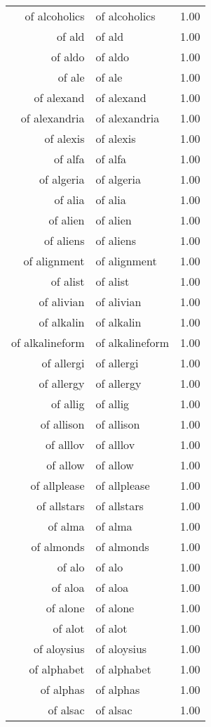 \begin{table}[ht]
\begin{tabular}{rlr}
  of alcoholics & of alcoholics & 1.00 \\ 
  of ald & of ald & 1.00 \\ 
  of aldo & of aldo & 1.00 \\ 
  of ale & of ale & 1.00 \\ 
  of alexand & of alexand & 1.00 \\ 
  of alexandria & of alexandria & 1.00 \\ 
  of alexis & of alexis & 1.00 \\ 
  of alfa & of alfa & 1.00 \\ 
  of algeria & of algeria & 1.00 \\ 
  of alia & of alia & 1.00 \\ 
  of alien & of alien & 1.00 \\ 
  of aliens & of aliens & 1.00 \\ 
  of alignment & of alignment & 1.00 \\ 
  of alist & of alist & 1.00 \\ 
  of alivian & of alivian & 1.00 \\ 
  of alkalin & of alkalin & 1.00 \\ 
  of alkalineform & of alkalineform & 1.00 \\ 
  of allergi & of allergi & 1.00 \\ 
  of allergy & of allergy & 1.00 \\ 
  of allig & of allig & 1.00 \\ 
  of allison & of allison & 1.00 \\ 
  of alllov & of alllov & 1.00 \\ 
  of allow & of allow & 1.00 \\ 
  of allplease & of allplease & 1.00 \\ 
  of allstars & of allstars & 1.00 \\ 
  of alma & of alma & 1.00 \\ 
  of almonds & of almonds & 1.00 \\ 
  of alo & of alo & 1.00 \\ 
  of aloa & of aloa & 1.00 \\ 
  of alone & of alone & 1.00 \\ 
  of alot & of alot & 1.00 \\ 
  of aloysius & of aloysius & 1.00 \\ 
  of alphabet & of alphabet & 1.00 \\ 
  of alphas & of alphas & 1.00 \\ 
  of alsac & of alsac & 1.00 \\ 

\end{tabular}
\end{table}
